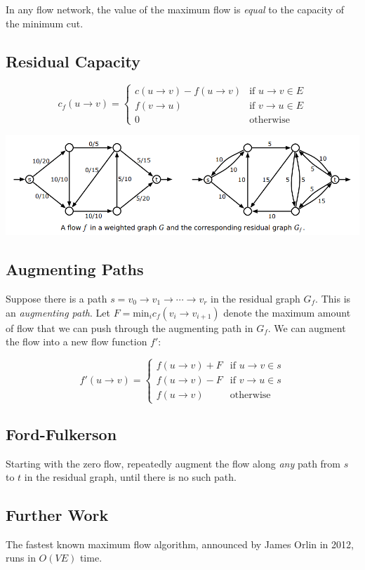 \begin{theorem}
	In any flow network, the value of the maximum flow is \emph{equal} to the capacity of the minimum cut.
\end{theorem}

\subsection{Residual Capacity}
\[
	c_f(u \rightarrow v) =
	\begin{cases}
		c(u \rightarrow v) - f(u \rightarrow v) & \text{if } u \rightarrow v \in E\\
		f(v \rightarrow u) & \text{if } v \rightarrow u \in E\\
		0 & \text{otherwise}
	\end{cases}
\]

\includegraphics[width=\linewidth]{images/residualgraph.png}

\subsection{Augmenting Paths}
Suppose there is a path $s = v_0 \rightarrow v_1 \rightarrow \cdots \rightarrow v_r$ in the residual graph $G_f$. This is an \emph{augmenting path}. Let $F = \text{min}_i c_f(v_i \rightarrow v_{i+1})$ denote the maximum amount of flow that we can push through the augmenting path in $G_f$. We can augment the flow into a new flow function $f'$:

\[
	f'(u \rightarrow v) =
	\begin{cases}
		f(u \rightarrow v) + F & \text{if } u \rightarrow v \in s\\
		f(u \rightarrow v) - F & \text{if } v \rightarrow u \in s\\
		f(u \rightarrow v) & \text{otherwise}
	\end{cases}
\]

\subsection{Ford-Fulkerson}
Starting with the zero flow, repeatedly augment the flow along \emph{any} path from $s$ to $t$ in the residual graph, until there is no such path.

\subsection{Further Work}
The fastest known maximum flow algorithm, announced by James Orlin in 2012, runs in $O(VE)$ time.